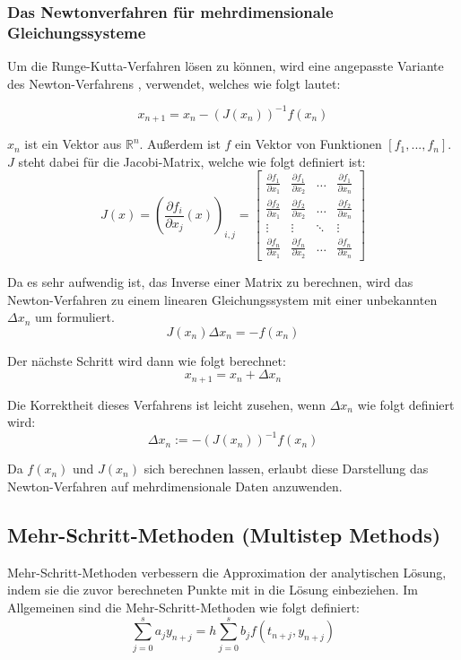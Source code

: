 \subsubsection{Das Newtonverfahren für mehrdimensionale Gleichungssysteme}

Um die Runge-Kutta-Verfahren lösen zu können, 
wird eine angepasste Variante des Newton-Verfahrens \cite[Kaptitel~5.1]{intorduction_to_numerical_analysis}, 
verwendet, welches wie folgt lautet:

$$
x_{n+1} = x_n - (J(x_n))^{-1} f(x_n)
$$

$x_n$ ist ein Vektor aus $\mathbb{R}^n$. 
Außerdem ist $f$ ein Vektor von Funktionen $[f_1, ..., f_n]$.
$J$ steht dabei für die Jacobi-Matrix, welche wie folgt definiert ist:
$$
J(x) = \left( \frac{\partial f_i}{\partial x_j}(x) \right)_{i, j} = \begin{bmatrix}
\frac{\partial f_1}{\partial x_1} & \frac{\partial f_1}{\partial x_2} & \dots & \frac{\partial f_1}{\partial x_n} \\
\frac{\partial f_2}{\partial x_1} & \frac{\partial f_2}{\partial x_2} & \dots & \frac{\partial f_2}{\partial x_n} \\
\vdots & \vdots & \ddots & \vdots \\
\frac{\partial f_n}{\partial x_1} & \frac{\partial f_n}{\partial x_2} & \dots & \frac{\partial f_n}{\partial x_n}
\end{bmatrix}
$$

Da es sehr aufwendig ist, das Inverse einer Matrix zu berechnen, wird das Newton-Verfahren zu einem linearen Gleichungssystem mit einer unbekannten $\Delta x_n$ um formuliert.
$$
J(x_n) \Delta x_n = -f(x_n)
$$

Der nächste Schritt wird dann wie folgt berechnet:
$$
x_{n+1} = x_n + \Delta x_n
$$

Die Korrektheit dieses Verfahrens ist leicht zusehen, wenn $\Delta x_n $
wie folgt definiert wird:
$$
\Delta x_n := -(J(x_n))^{-1} f(x_n)
$$

Da $f(x_n)$ und $J(x_n)$ sich berechnen lassen, 
erlaubt diese Darstellung das Newton-Verfahren auf mehrdimensionale Daten anzuwenden. 


\subsection{Mehr-Schritt-Methoden (Multistep Methods)} \label{sec:multi_step}

Mehr-Schritt-Methoden \cite[Kapitel~III.1]{ode1} verbessern die Approximation der analytischen Lösung, indem sie die
zuvor berechneten Punkte mit in die Lösung einbeziehen.
Im Allgemeinen sind die Mehr-Schritt-Methoden wie folgt definiert:
$$
\sum_{j= 0}^{s} a_j y_{n+j} = h \sum_{j=0}^s b_j f(t_{n+j}, y_{n+j})
$$

